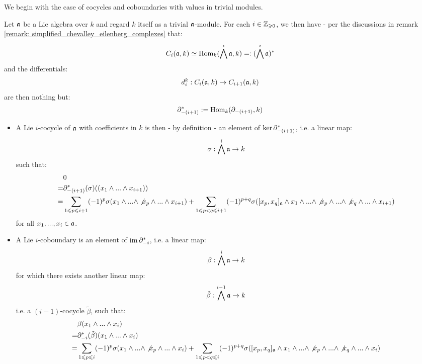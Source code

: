         We begin with the case of cocycles and coboundaries with values in trivial modules. 
        \begin{example} \label{example: lie_cocycles_and_coboundaries_with_trivial_coefficients}
            Let $\mathfrak{a}$ be a Lie algebra over $k$ and regard $k$ itself as a trivial $\mathfrak{a}$-module. For each $i \in \mathbb{Z}_{\geqslant 0}$, we then have - per the discussions in remark \ref{remark: simplified_chevalley_eilenberg_complexes} that:
                $$C_i(\mathfrak{a}, k) \simeq \mathrm{Hom}_k(\bigwedge^i \mathfrak{a}, k) =: (\bigwedge^i \mathfrak{a})^*$$
            and the differentials:
                $$d_i^k: C_i(\mathfrak{a}, k) \to C_{i + 1}(\mathfrak{a}, k)$$
            are then nothing but:
                $$\partial_{-(i + 1)}^* := \mathrm{Hom}_k(\partial_{-(i + 1)}, k)$$
            \begin{itemize}
                \item A Lie $i$-cocycle of $\mathfrak{a}$ with coefficients in $k$ is then - by definition - an element of $\ker \partial_{-(i + 1)}^*$, i.e. a linear map:
                    $$\sigma: \bigwedge^i \mathfrak{a} \to k$$
                such that:
                    $$
                        \begin{aligned}
                            & 0
                            \\
                            = & \partial_{-(i + 1)}^*(\sigma)( (x_1 \wedge ... \wedge x_{i + 1}) )
                            \\
                            = & \sum_{1 \leqslant p \leqslant i + 1} (-1)^p \sigma(x_1 \wedge ... \wedge \not{x_p} \wedge ... \wedge x_{i + 1}) + \sum_{1 \leqslant p < q \leqslant i + 1} (-1)^{p + q} \sigma( [x_p, x_q]_{\mathfrak{a}} \wedge x_1 \wedge ... \wedge \not{x_p} \wedge ... \wedge \not{x_q} \wedge ... \wedge x_{i + 1})
                        \end{aligned}
                    $$
                for all $x_1, ..., x_i \in \mathfrak{a}$.
                \item A Lie $i$-coboundary is an element of $\operatorname{im} \partial_{-i}^*$, i.e. a linear map:
                    $$\beta: \bigwedge^i \mathfrak{a} \to k$$
                for which there exists another linear map:
                    $$\tilde{\beta}: \bigwedge^{i - 1} \mathfrak{a} \to k$$
                i.e. a $(i - 1)$-cocycle $\tilde{\beta}$, such that:
                    $$
                        \begin{aligned}
                            & \beta(x_1 \wedge ... \wedge x_i)
                            \\
                            = & \partial_{-i}^*(\tilde{\beta})(x_1 \wedge ... \wedge x_i)
                            \\
                            = & \sum_{1 \leqslant p \leqslant i} (-1)^p \sigma(x_1 \wedge ... \wedge \not{x_p} \wedge ... \wedge x_i) + \sum_{1 \leqslant p < q \leqslant i} (-1)^{p + q} \sigma( [x_p, x_q]_{\mathfrak{a}} \wedge x_1 \wedge ... \wedge \not{x_p} \wedge ... \wedge \not{x_q} \wedge ... \wedge x_i)
                        \end{aligned}
                    $$
            \end{itemize}
        \end{example}
